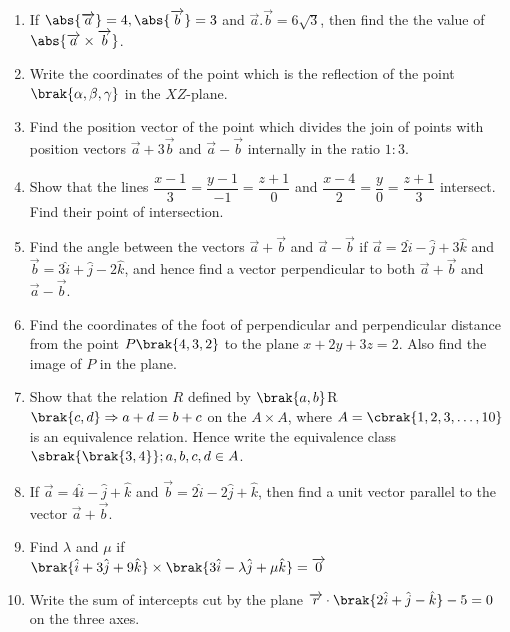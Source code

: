 \begin{enumerate}
	\item If $\abs{\overrightarrow{a}} = 4, \abs{\overrightarrow{b}} = 3$ and $ \overrightarrow{a}.\overrightarrow{b} = 6\sqrt{3}$, then find the the value of $\abs{\overrightarrow{a}\times \overrightarrow{b}}$.
	\item Write the coordinates of the point which is the reflection of the point $\brak{\alpha,\beta,\gamma}$ in the $XZ$-plane.
	\item Find the position vector of the point which divides the join of points with position vectors $\overrightarrow{a} + 3\overrightarrow{b}$ and $\overrightarrow{a} - \overrightarrow{b}$ internally in the ratio $1:3$.
	\item Show that the lines $\dfrac{x-1}{3} = \dfrac{y-1}{-1} = \dfrac{z+1}{0}$ and $ \dfrac{x-4}{2} = \dfrac{y}{0} = \dfrac{z+1}{3}$ intersect. Find their point of intersection.
	\item Find the angle between the vectors $ \overrightarrow{a} + \overrightarrow{b} $ and $ \overrightarrow{a} - \overrightarrow{b} $ if $ \overrightarrow{a} = 2\hat{i} - \hat{j} +3\hat{k} $ and $ \overrightarrow{b} = 3\hat{i} + \hat{j} - 2\hat{k}$, and hence find a vector perpendicular to both $ \overrightarrow{a} + \overrightarrow{b} $ and $\overrightarrow{a} - \overrightarrow{b}$.
	\item Find the coordinates of the foot of perpendicular and perpendicular distance from the point $P\brak{4,3,2}$ to the plane $x + 2y + 3z = 2$. Also find the image of $P$ in the plane.
	\item Show that the relation $R$ defined by $\brak{a,b}$R$\brak{c,d} \Rightarrow a + d = b + c$ on the $A\times A$, where $A = \cbrak{1,2,3,\ldots,10}$ is an equivalence relation. Hence write the equivalence class $\sbrak{\brak{3,4}}; a,b,c,d \in A$.

	\item If $\overrightarrow{a} = 4\hat{i} -\hat{j} + \hat{k}$ and $\overrightarrow{b} = 2\hat{i} -2\hat{j} + \hat{k} $, then find a unit vector parallel to the vector $\overrightarrow{a} + \overrightarrow{b} $.

	\item Find $\lambda$ and $\mu$ if\\
	      $\brak{\hat{i} + 3\hat{j} + 9\hat{k}}\times\brak{3\hat{i} - \lambda\hat{j} + \mu\hat{k}} = \overrightarrow{0}$

	\item Write the sum of intercepts cut by the plane $\overrightarrow{r}\cdot\brak{2\hat{i} + \hat{j} - \hat{k}} - 5 = 0$ on the three axes.


\end{enumerate}

